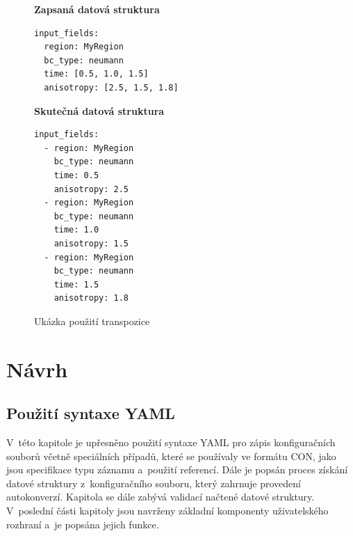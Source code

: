 \documentclass[FM,bw,DP]{tulthesis}
\begin{document}
\begin{figure}[ht]
\singlespacing
\begin{minipage}[t]{0.5\linewidth}
\vspace{0pt}
\textbf{Zapsaná datová struktura}\\
\vspace{-5pt}
\begin{lstlisting}
input_fields: 
  region: MyRegion
  bc_type: neumann
  time: [0.5, 1.0, 1.5]
  anisotropy: [2.5, 1.5, 1.8]
\end{lstlisting}
\end{minipage}
\hfill
\begin{minipage}[t]{0.45\linewidth}
\vspace{0pt}
\textbf{Skutečná datová struktura}\\
\vspace{-5pt}
\begin{lstlisting}
input_fields: 
  - region: MyRegion
    bc_type: neumann
    time: 0.5
    anisotropy: 2.5
  - region: MyRegion
    bc_type: neumann
    time: 1.0
    anisotropy: 1.5
  - region: MyRegion
    bc_type: neumann
    time: 1.5
    anisotropy: 1.8
\end{lstlisting}
\vspace*{-20pt}
\end{minipage}
\onehalfspacing
\caption{Ukázka použití transpozice}
\label{img:transposition_code_example}
\end{figure}

\chapter{Návrh}


\section{Použití syntaxe YAML}
V~této kapitole je upřesněno použití syntaxe \gls{YAML} pro zápis konfiguračních souborů včetně speciálních případů, které se používaly ve formátu \gls{CON}, jako jsou specifikace typu záznamu a~použití referencí. Dále je popsán proces získání datové struktury z~konfiguračního souboru, který zahrnuje provedení autokonverzí. Kapitola se dále zabývá validací načtené datové struktury. V~poslední části kapitoly jsou navrženy základní komponenty uživatelského rozhraní a~je popsána jejich funkce.

\end{document}
